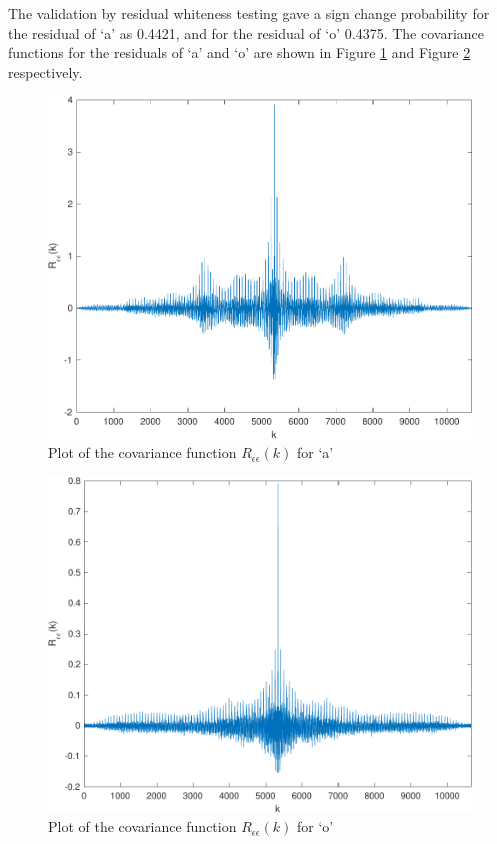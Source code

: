 \documentclass{IEEEtran}
\begin{document}
The validation by residual whiteness testing gave a sign change probability for
the residual of `a' as 0.4421, and for the residual of `o' 0.4375. The
covariance functions for the
residuals of `a' and `o' are shown in Figure \ref{fig:acorra} and Figure
\ref{fig:acorro} respectively.

\begin{figure}[h!]
    \centering
    \captionsetup{justification=centering}
    \includegraphics[width=0.8\columnwidth]{pictures/acorr_a.pdf}
    \caption{Plot of the covariance function $R_{\epsilon\epsilon}(k)$ for `a'}
    \label{fig:acorra}
\end{figure}

\begin{figure}[h!]
    \centering
    \captionsetup{justification=centering}
    \includegraphics[width=0.8\columnwidth]{pictures/acorr_o.pdf}
    \caption{Plot of the covariance function $R_{\epsilon\epsilon}(k)$ for `o'}
    \label{fig:acorro}
\end{figure}
\end{document}
